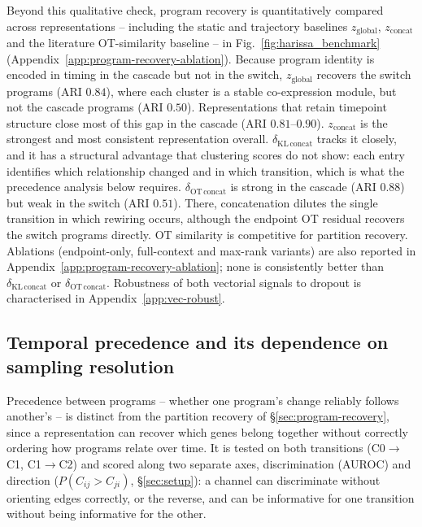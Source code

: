 \documentclass[10pt, letterpaper]{article}
\begin{document}
Beyond this qualitative check, program recovery is quantitatively compared across representations -- including the static and trajectory baselines $z_{\mathrm{global}}$, $z_{\mathrm{concat}}$ and the literature OT-similarity baseline -- in Fig.~\ref{fig:harissa_benchmark} (Appendix~\ref{app:program-recovery-ablation}). Because program identity is encoded in timing in the cascade but not in the switch, $z_{\mathrm{global}}$ recovers the switch programs (ARI $0.84$), where each cluster is a stable co-expression module, but not the cascade programs (ARI $0.50$). Representations that retain timepoint structure close most of this gap in the cascade (ARI $0.81$--$0.90$). $z_{\mathrm{concat}}$ is the strongest and most consistent representation overall. $\delta_{\mathrm{KL\,concat}}$ tracks it closely, and it has a structural advantage that clustering scores do not show: each entry identifies which relationship changed and in which transition, which is what the precedence analysis below requires. $\delta_{\mathrm{OT\,concat}}$ is strong in the cascade (ARI $0.88$) but weak in the switch (ARI $0.51$). There, concatenation dilutes the single transition in which rewiring occurs, although the endpoint OT residual recovers the switch programs directly. OT similarity is competitive for partition recovery. Ablations (endpoint-only, full-context and max-rank variants) are also reported in Appendix~\ref{app:program-recovery-ablation}; none is consistently better than $\delta_{\mathrm{KL\,concat}}$ or $\delta_{\mathrm{OT\,concat}}$. Robustness of both vectorial signals to dropout is characterised in Appendix~\ref{app:vec-robust}.



\subsection{Temporal precedence and its dependence on sampling resolution}
\label{sec:precedence}

Precedence between programs -- whether one program's change reliably follows another's -- is distinct from the partition recovery of \S\ref{sec:program-recovery}, since a representation can recover which genes belong together without correctly ordering how programs relate over time. It is tested on both transitions (C0$\to$C1, C1$\to$C2) and scored along two separate axes, discrimination (AUROC) and direction ($P(C_{ij}>C_{ji})$, \S\ref{sec:setup}): a channel can discriminate without orienting edges correctly, or the reverse, and can be informative for one transition without being informative for the other.
\end{document}
